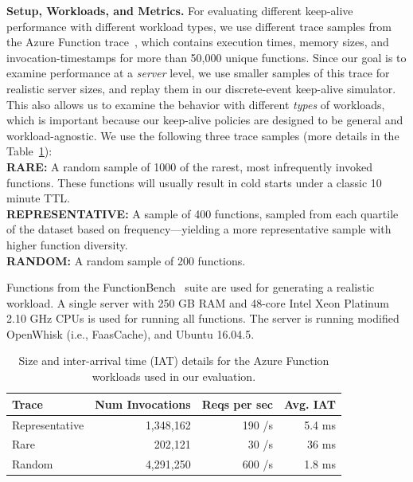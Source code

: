 \noindent \textbf{Setup, Workloads, and Metrics.}
%
For evaluating different keep-alive performance with different workload types, we use different trace samples from the Azure Function trace~\cite{shahrad_serverless_2020}, which contains execution times, memory sizes, and invocation-timestamps for more than 50,000 unique functions. 
Since our goal is to examine performance at a \emph{server} level, we use smaller samples of this trace for realistic server sizes, and replay them in our discrete-event keep-alive simulator. 
This also allows us to examine the behavior with different \emph{types} of workloads, which is important because our keep-alive policies are designed to be general and workload-agnostic.
We use the following three trace samples (more details in the Table~\ref{tab:trace-deets}): \\
\noindent \textbf{RARE:} A random sample of 1000 of the rarest, most infrequently invoked functions. These functions will usually result in cold starts under a classic 10 minute TTL.  \\
\noindent \textbf{REPRESENTATIVE:} A sample of 400 functions, sampled from each quartile of the dataset based on frequency---yielding a more representative sample with higher function diversity. \\
\noindent \textbf{RANDOM:} A random sample of 200 functions.

Functions from the FunctionBench~\cite{kim_functionbench_2019} suite are used for generating a realistic workload. 
A single server with 250 GB RAM and 48-core Intel Xeon Platinum 2.10 GHz CPUs is used for running all functions. The server is running modified OpenWhisk (i.e., FaasCache), and Ubuntu 16.04.5. 

\begin{table}
  \centering
  \caption{Size and inter-arrival time (IAT) details for the Azure Function workloads used in our evaluation.}
  \begin{tabular}{lrrr}
    \hline 
    Trace & Num Invocations & Reqs per sec & Avg. IAT \\
    \hline
    Representative & 1,348,162 & 190 /s & 5.4 ms \\
    Rare & 202,121 & 30 /s & 36 ms \\
    Random & 4,291,250 & 600 /s & 1.8 ms \\
    \hline
  \end{tabular}
  \label{tab:trace-deets}
\end{table}



